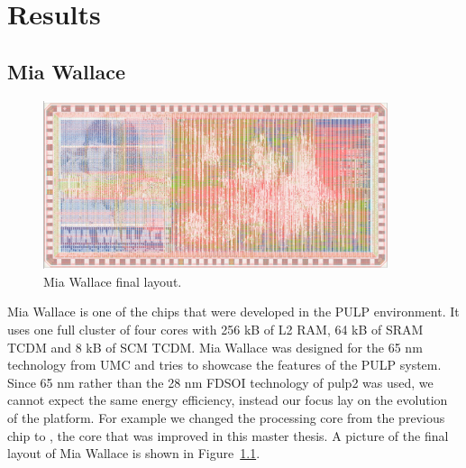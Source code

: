 
\chapter{Results}

\label{chapter:results}

\section[Mia Wallace]{Mia Wallace\protect\footnotemark}


\begin{figure}[htbp]
  \centering\includegraphics[width=0.9\textwidth]{./figures/mia_wallace_layout_rev_sml}
  \caption{Mia Wallace final layout.}
  \label{fig:mia_final_layout}
\end{figure}

Mia Wallace is one of the chips that were developed in the \gls{PULP}
environment. It uses one full cluster of four cores with 256 kB of L2 \gls{RAM},
64 kB of SRAM TCDM and 8 kB of SCM TCDM. Mia Wallace was designed for the 65
nm technology from UMC and tries to showcase the features of the PULP system.
Since 65 nm rather than the 28 nm FDSOI technology of pulp2 was used, we cannot
expect the same energy efficiency, instead our focus lay on the evolution of the
platform. For example we changed the processing core from the previous
chip to \orion, the core that was improved in this master thesis. A picture of
the final layout of Mia Wallace is shown in Figure~\ref{fig:mia_final_layout}.

